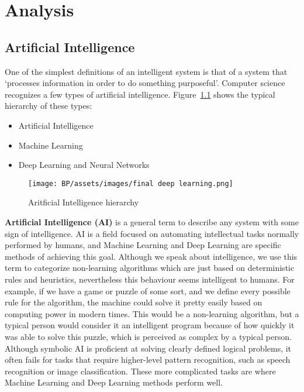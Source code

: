 \chapter{Analysis}

\section{Artificial Intelligence} %
One of the simplest definitions of an intelligent system is that of a system
that ‘processes information in order to do something purposeful’\cite{Dignum_2019}.
Computer science recognizes a few types of artificial intelligence. Figure~\ref{fig:AI-ML-DL-NN} shows the typical hierarchy of these types:

\begin{itemize}
    \item Artificial Intelligence
    \item Machine Learning
    \item Deep Learning and Neural Networks
\end{itemize}

\begin{figure}[h]
\begin{centering}
\texttt{[image: BP/assets/images/final deep learning.png]}
\par\end{centering}
\caption{Aritficial Intelligence hierarchy\cite{ai_hierarchy_pic}
\label{fig:AI-ML-DL-NN}}
\end{figure}


\textbf{Artificial Intelligence (AI)} is a general term to describe any system with some sign of intelligence. AI is a field focused on automating intellectual tasks normally performed by humans, and Machine Learning and Deep Learning are specific methods of achieving this goal.\cite{AI-ML-DL} Although we speak about intelligence, we use this term to categorize non-learning algorithms which are just based on deterministic rules and heuristics, nevertheless this behaviour seems intelligent to humans. For example, if we have a game or puzzle of some sort, and we define every possible rule for the algorithm, the machine could solve it pretty easily based on computing power in modern times. This would be a non-learning algorithm, but a typical person would consider it an intelligent program because of how quickly it was able to solve this puzzle, which is perceived as complex by a typical person. Although symbolic AI is proficient at solving clearly defined logical problems, it often fails for tasks that require higher-level pattern recognition, such as speech recognition or image classification. These more complicated tasks are where Machine Learning and Deep Learning methods perform well\cite{AI-ML-DL}.

